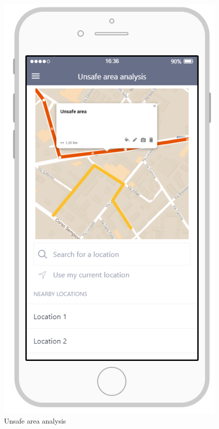 \documentclass{article}
\begin{document}
\begin{figure}[H]
    \centering
    \includegraphics[scale=0.7]{Images/UnsafeAreaAnalysisAPP}
    \caption{Unsafe area analysis}
\end{figure}
\end{document}
